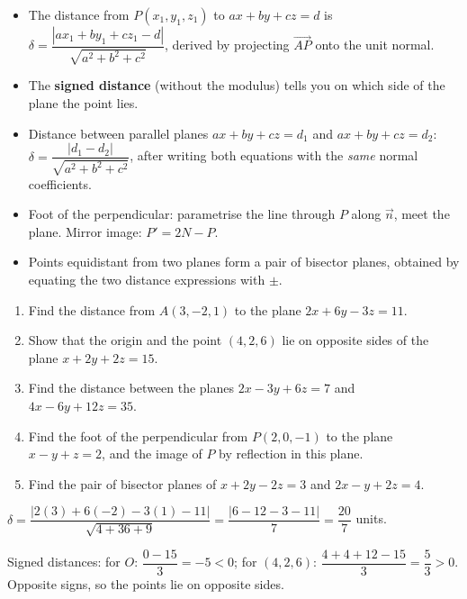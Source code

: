 \documentclass[11pt]{article}
\begin{document}
\begin{aretenir}
\begin{itemize}
\item The distance from $P(x_1,y_1,z_1)$ to $ax+by+cz=d$ is $\delta = \dfrac{|ax_1+by_1+cz_1-d|}{\sqrt{a^2+b^2+c^2}}$, derived by projecting $\vec{AP}$ onto the unit normal.
\item The \textbf{signed distance} (without the modulus) tells you on which side of the plane the point lies.
\item Distance between parallel planes $ax+by+cz=d_1$ and $ax+by+cz=d_2$: $\delta = \dfrac{|d_1-d_2|}{\sqrt{a^2+b^2+c^2}}$, after writing both equations with the \emph{same} normal coefficients.
\item Foot of the perpendicular: parametrise the line through $P$ along $\vec{n}$, meet the plane. Mirror image: $P' = 2N - P$.
\item Points equidistant from two planes form a pair of bisector planes, obtained by equating the two distance expressions with $\pm$.
\end{itemize}
\end{aretenir}

\begin{exercice}[Practice]
\begin{enumerate}
\item Find the distance from $A(3, -2, 1)$ to the plane $2x + 6y - 3z = 11$.
\item Show that the origin and the point $(4, 2, 6)$ lie on opposite sides of the plane $x + 2y + 2z = 15$.
\item Find the distance between the planes $2x - 3y + 6z = 7$ and $4x - 6y + 12z = 35$.
\item Find the foot of the perpendicular from $P(2, 0, -1)$ to the plane $x - y + z = 2$, and the image of $P$ by reflection in this plane.
\item Find the pair of bisector planes of $x + 2y - 2z = 3$ and $2x - y + 2z = 4$.
\end{enumerate}
\end{exercice}

\begin{corrige}[Exercise 1]
$\delta = \dfrac{|2(3) + 6(-2) - 3(1) - 11|}{\sqrt{4+36+9}} = \dfrac{|6 - 12 - 3 - 11|}{7} = \dfrac{20}{7}$ units.
\end{corrige}

\begin{corrige}[Exercise 2]
Signed distances: for $O$: $\dfrac{0 - 15}{3} = -5 < 0$; for $(4,2,6)$: $\dfrac{4 + 4 + 12 - 15}{3} = \dfrac{5}{3} > 0$. Opposite signs, so the points lie on opposite sides.
\end{corrige}
\end{document}
